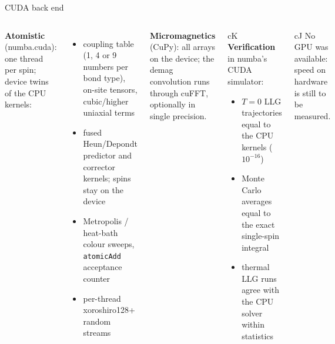 \begin{frame}{CUDA back end }
\begin{columns}[T]
\small
\textbf{Atomistic} (numba.cuda): one thread per spin; device twins of the CPU kernels:
\begin{itemize}\small
\item coupling table (1, 4 or 9 numbers per bond type), on-site tensors, cubic/higher uniaxial terms
\item fused Heun/Depondt predictor and corrector kernels; spins stay on the device
\item Metropolis / heat-bath colour sweeps, \texttt{atomicAdd} acceptance counter
\item per-thread xoroshiro128+ random streams
\end{itemize}
\textbf{Micromagnetics} (CuPy): all arrays on the device; the demag convolution runs through cuFFT, optionally in single precision.
\begin{plainbox}{cK}
\small\textbf{Verification} in numba's CUDA simulator:
\begin{itemize}\small
\item $T=0$ LLG trajectories equal to the CPU kernels ($10^{-16}$)
\item Monte Carlo averages equal to the exact single-spin integral
\item thermal LLG runs agree with the CPU solver within statistics
\end{itemize}
\end{plainbox}
\begin{plainbox}{cJ}
\small No GPU was available: speed on hardware is still to be measured.
\end{plainbox}
\end{columns}
\end{frame}


